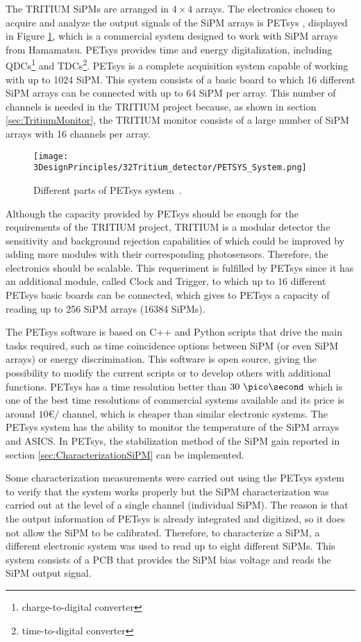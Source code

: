 The TRITIUM SiPMs are arranged in $4\times 4$ arrays. The electronics chosen to acquire and analyze the output signals of the SiPM arrays is PETsys \cite{PETSYS}, displayed in Figure \ref{fig:PETSYS}, which is a commercial system designed to work with SiPM arrays from Hamamatsu. PETsys provides time and energy digitalization, including QDCs\footnote{charge-to-digital converter} and TDCs\footnote{time-to-digital converter}. PETsys is a complete acquisition system capable of working with up to 1024 SiPM. This system consists of a basic board to which 16 different SiPM arrays can be connected with up to 64 SiPM per array. This number of channels is needed in the TRITIUM project because, as shown in section \ref{sec:TritiumMonitor}, the TRITIUM monitor consists of a large number of SiPM arrays with 16 channels per array.

\begin{figure}[h]
\centering
\texttt{[image: 3DesignPrinciples/32Tritium\_detector/PETSYS\_System.png]}
\caption{Different parts of PETsys system\label{fig:PETSYS}~\cite{PETSYS}.}
\end{figure}
Although the capacity provided by PETsys should be enough for the requirements of the TRITIUM project, TRITIUM is a modular detector the sensitivity and background rejection capabilities of which could be improved by adding more modules with their corresponding photosensors. Therefore, the electronics should be scalable. This requeriment is fulfilled by PETsys since it has an additional module, called Clock and Trigger, to which up to $16$ different PETsys basic boards can be connected, which gives to PETsys a capacity of reading up to 256 SiPM arrays (16384 SiPMs). 

The PETsys software is based on C++ and Python scripts that drive the main tasks required, such as time coincidence options between SiPM (or even SiPM arrays) or energy discrimination. This software is open source, giving the possibility to modify the current scripts or to develop others with additional functions. PETsys has a time resolution better than $30~\pico\second$ which is one of the best time resolutions of commercial systems available and its price is around $10$\euro$/$ channel, which is cheaper than similar electronic systems. The PETsys system has the ability to monitor the temperature of the SiPM arrays and ASICS. In PETsys, the stabilization method of the SiPM gain reported in section \ref{sec:CharacterizationSiPM} can be implemented.

Some characterization measurements were carried out using the PETsys system to verify that the system works properly but the SiPM characterization was carried out at the level of a single channel (individual SiPM). The reason is that the output information of PETsys is already integrated and digitized, so it does not allow the SiPM to be calibrated. Therefore, to characterize a SiPM, a different electronic system was used to read up to eight different SiPMs. This system consists of a PCB that provides the SiPM bias voltage and reads the SiPM output signal. 

